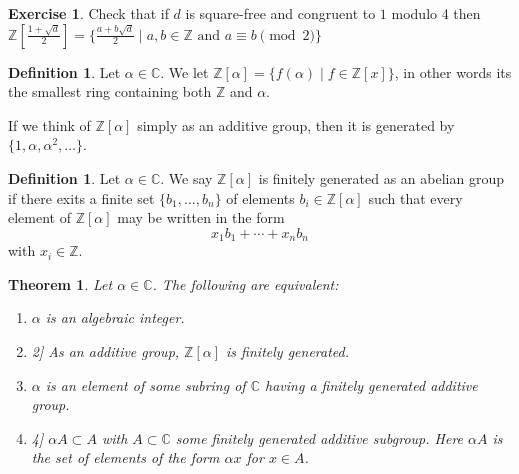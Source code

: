 \documentclass[11pt,a4paper]{report}
\theoremstyle{plain}
\newtheorem{thm}[subsection]{Theorem}
\theoremstyle{definition}
\newtheorem{defn}[subsection]{Definition}
\theoremstyle{definition}
\newtheorem{question}[subsection]{Exercise}
\newcommand{\ZZ}{\mathbb{Z}}
\def\CC{\mathbb{C}}
\def\edbb{\epsdice[black]{2}}
\def\edbbb{\epsdice[black]{4}}
\def \a{\alpha}
\begin{document}
	
	\begin{question}
		Check that if $d$ is square-free and congruent to $1$ modulo $4$ then $\ZZ[\frac{1+\sqrt{d}}{2}]=\{\frac{a+b\sqrt{d}}{2} \mid a,b \in \ZZ \text{ and } a \equiv b \pmod 2 \}$
	\end{question}
	
	\begin{defn}\label{defn: Z alpha}
		Let $\a \in \CC$. We let $\ZZ[\a]=\{f(\a) \mid f \in \ZZ[x]\}$, in other words its the smallest ring containing both $\ZZ$ and $\a$.
	\end{defn}
	
	If we think of $\ZZ[\a]$ simply as an additive group, then it is generated by $\{1,\a,\a^2,\dots\}$. 
	
	\begin{defn}
		Let $\a \in \CC$. We say $\ZZ[\a]$ is finitely generated as an abelian group if there exits a finite set $\{b_1,\dots,b_n\}$ of elements $b_i \in \ZZ[\a]$ such that every element of $\ZZ[\a]$ may be written in the form \[x_1b_1+\cdots+x_nb_n\] with $x_i \in \ZZ$.
	\end{defn}
	
	
	\begin{thm}\label{thm: alg ints fin gen}
		Let $\a \in \CC$. The following are equivalent:
		
		\begin{enumerate}
			\item[\epsdice{1}] $\a$ is an algebraic integer.
			\item[\edbb]  As an additive group, $\ZZ[\a]$ is finitely generated.
			\item[\epsdice{3}] $\a$ is an element of some subring of $\CC$ having a finitely generated additive group.
			\item[\edbbb]  $\a A \subset A$  with  $A \subset \CC$ some finitely generated additive subgroup. Here $\a A$ is the set of elements of the form $\a x$ for $x \in A$.
		\end{enumerate}
		
		
	\end{thm}
	
\end{document}

